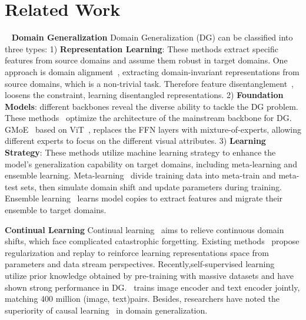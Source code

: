 \documentclass{article} \usepackage{iclr2024_conference,times}
\begin{document}
\section{Related Work} ~\label{sec:related}
\textbf{Domain Generalization} Domain Generalization (DG) can be classified into three types:
1) \textbf{Representation Learning}: These methods extract specific features from source domains and assume them robust in target domains. One approach is domain alignment~\citep{li2018deep,li2018domain,dg_mmld}, extracting domain-invariant representations from source domains, which is a non-trivial task. Therefore feature disentanglement~\citep{rojas2018invariant,piratla2020efficient,christiansen2021causal,mahajan2021domain,sun2021recovering,liu2021learning}, loosens the constraint, learning disentangled representations.
2) \textbf{Foundation Models}: different backbones reveal the diverse ability to tackle the DG problem. These methods~\citep{li2017deeper,ding2017deep,carlucci2019domain,li2022sparse}  optimize the architecture of the mainstream backbone for DG. GMoE~\citep{li2022sparse} based on ViT~\citep{dosovitskiy2020image}, replaces the FFN layers with mixture-of-experts, allowing different experts to focus on the different visual attributes.
3) \textbf{Learning Strategy}: These methods utilize machine learning strategy to enhance the model’s generalization capability on target domains, including meta-learning and ensemble learning. Meta-learning~\citep{li2018learning,li2019feature,li2019episodic,dou2019domain,liu2020shape,chen2022ost,li2021metasaug} divide training data into meta-train and meta-test sets, then simulate domain shift and update parameters during training. Ensemble learning~\citep{ding2017deep,zhou2021domain,cha2021swad} learns model copies to extract features and migrate their ensemble to target domains.

\textbf{Continual Learning} Continual learning~\citep{de2021continual} aims to relieve continuous domain shifts, which face complicated catastrophic forgetting. Existing methods~\citep{rebuffi2017icarl,zenke2017continual,kirkpatrick2017overcoming,li2017learning,lao2020continuous} propose regularization and replay to reinforce learning representations space from parameters and data stream perspectives.
Recently,self-supervised learning~\citep{radford2015unsupervised,he2022masked,grill2020bootstrap} utilize prior knowledge obtained by pre-training with massive datasets and have shown strong performance in DG.~\cite{radford2021learning} trains image encoder and text encoder jointly, matching 400 million (image, text)pairs. Besides, researchers have noted the superiority of causal learning~\citep{zhou2021domain,mahajan2021domain} in domain generalization.
\end{document}
